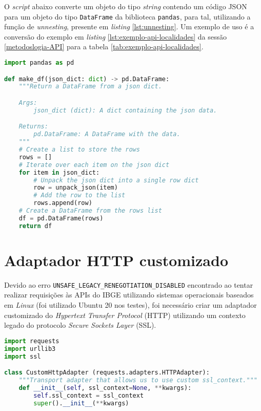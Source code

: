 \begin{apendicesenv}
    O \textit{script} abaixo converte um objeto do tipo \textit{string} contendo um código JSON para um objeto do tipo \verb|DataFrame| da biblioteca \verb|pandas|, para tal, utilizando a função de \textit{unnesting}, presente em \textit{listing} \ref{lst:unnesting}. Um exemplo de uso é a conversão do exemplo em \textit{listing} \ref{lst:exemplo-api-localidades} da sessão \ref{metodoslogia-API} para a tabela \ref{tab:exemplo-api-localidades}.

\begin{lstlisting}[label={lst:make-df},language=Python, caption=Algoritmo de transformação de \textit{string} JSON para um objeto do tipo \textit{pandas.DataFrame}.]
import pandas as pd

def make_df(json_dict: dict) -> pd.DataFrame:
    """Return a DataFrame from a json dict.

    Args:
        json_dict (dict): A dict containing the json data.

    Returns:
        pd.DataFrame: A DataFrame with the data.
    """
    # Create a list to store the rows
    rows = []
    # Iterate over each item on the json dict
    for item in json_dict:
        # Unpack the json dict into a single row dict
        row = unpack_json(item)
        # Add the row to the list
        rows.append(row)
    # Create a DataFrame from the rows list
    df = pd.DataFrame(rows)
    return df
\end{lstlisting}

\section{Adaptador HTTP customizado}

    Devido ao erro \verb|UNSAFE_LEGACY_RENEGOTIATION_DISABLED| encontrado ao tentar realizar requisições às APIs do IBGE utilizando sistemas operacionais baseados em \textit{Linux} (foi utilizado Ubuntu 20 nos testes), foi necessário criar um adaptador customizado do \textit{Hypertext Transfer Protocol} (HTTP) utilizando um contexto legado do protocolo \textit{Secure Sockets Layer} (SSL).

\begin{lstlisting}[label={lst:http-adapt},language=Python, caption=Algoritmo de transformação de \textit{string} JSON para um objeto do tipo \textit{pandas.DataFrame}.]
import requests
import urllib3
import ssl

class CustomHttpAdapter (requests.adapters.HTTPAdapter):
    """Transport adapter that allows us to use custom ssl_context."""
    def __init__(self, ssl_context=None, **kwargs):
        self.ssl_context = ssl_context
        super().__init__(**kwargs)


\end{lstlisting}
\end{apendicesenv}
